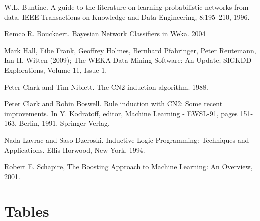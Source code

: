 \documentclass[a4paper]{llncs}
\begin{document}
\begin{thebibliography}{1}
W.L. Buntine. A guide to the literature on learning probabilistic networks from data. IEEE 
Transactions on Knowledge and Data Engineering, 8:195–210, 1996.

Remco R. Bouckaert. Bayesian Network Classifiers in Weka. 2004

Mark Hall, Eibe Frank, Geoffrey Holmes, Bernhard Pfahringer, Peter Reutemann, Ian H. Witten (2009); The WEKA Data Mining Software: An Update; SIGKDD Explorations, Volume 11, Issue 1.

Peter Clark and Tim Niblett. The CN2 induction algorithm. 1988.

Peter Clark and Robin Boswell. Rule induction with CN2: Some recent improvements. In Y. Kodratoff, editor, Machine Learning - EWSL-91, pages 151-163, Berlin, 1991. Springer-Verlag.

Nada Lavrac and Saso Dzeroski. Inductive Logic Programming: Techniques and Applications. Ellis Horwood, New York, 1994.

Robert E. Schapire, The Boosting Approach to Machine Learning: An Overview, 2001.

\end{thebibliography}

\clearpage

\appendix

\section{Tables}
\end{document}
